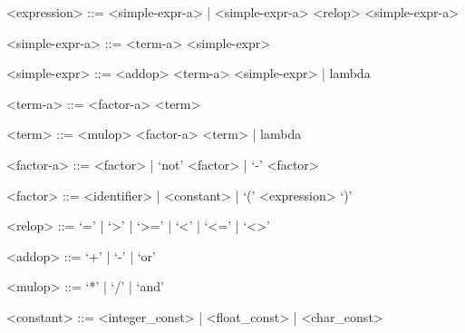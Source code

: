 \begin{grammar}
    <expression> ::= <simple-expr-a> | <simple-expr-a> <relop> <simple-expr-a>
    
    <simple-expr-a> ::= <term-a> <simple-expr>

    <simple-expr> ::= <addop> <term-a> <simple-expr> | lambda
    
    <term-a> ::= <factor-a> <term>

    <term> ::= <mulop> <factor-a> <term> | lambda
    
    <factor-a> ::= <factor> | `not' <factor> | `-' <factor>
    
    <factor> ::= <identifier> | <constant> | `(' <expression> `)'
    
    <relop> ::= `=' | `>' | `>=' | `<' | `<=' | `<>'
    
    <addop> ::= `+' | `-' | `or'
    
    <mulop> ::= `*' | `/' | `and'
    
    <constant> ::= <integer_const> | <float_const> | <char_const>
    
    \end{grammar}